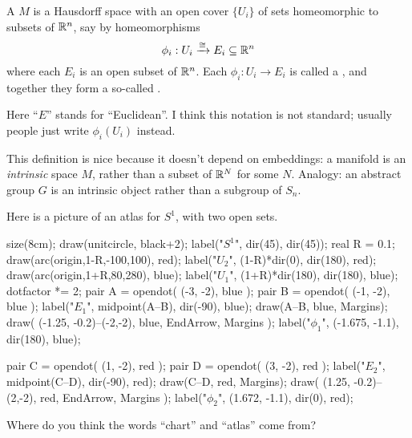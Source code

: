 \begin{definition}
	A  $M$ is a Hausdorff space
	with an open cover $\{U_i\}$ of sets
	homeomorphic to subsets of $\mathbb R^n$,
	say by homeomorphisms
	\[ \phi_i : U_i \xrightarrow{\cong} E_i \subseteq \mathbb R^n \]
	where each $E_i$ is an open subset of $\mathbb R^n$.
	Each $\phi_i \colon U_i \to E_i$ is called a ,
	and together they form a so-called .
\end{definition}
\begin{remark}
	Here ``$E$'' stands for ``Euclidean''.
	I think this notation is not standard; usually
	people just write $\phi_i(U_i)$ instead.
\end{remark}
\begin{remark}
	This definition is nice because it doesn't depend on embeddings:
	a manifold is an \emph{intrinsic} space $M$,
	rather than a subset of $\mathbb R^N$ for some $N$.
	Analogy: an abstract group $G$ is an intrinsic object
	rather than a subgroup of $S_n$.
\end{remark}

\begin{example}[An atlas on $S^1$]
Here is a picture of an atlas for $S^1$, with two open sets.
\begin{center}
	\begin{asy}
		size(8cm);
		draw(unitcircle, black+2);
		label("$S^1$", dir(45), dir(45));
		real R = 0.1;
		draw(arc(origin,1-R,-100,100), red);
		label("$U_2$", (1-R)*dir(0), dir(180), red);
		draw(arc(origin,1+R,80,280), blue);
		label("$U_1$", (1+R)*dir(180), dir(180), blue);
		dotfactor *= 2;
		pair A = opendot( (-3, -2), blue );
		pair B = opendot( (-1, -2), blue );
		label("$E_1$", midpoint(A--B), dir(-90), blue);
		draw(A--B, blue, Margins);
		draw( (-1.25, -0.2)--(-2,-2), blue, EndArrow, Margins );
		label("$\phi_1$", (-1.675, -1.1), dir(180), blue);

		pair C = opendot( (1, -2), red );
		pair D = opendot( (3, -2), red );
		label("$E_2$", midpoint(C--D), dir(-90), red);
		draw(C--D, red, Margins);
		draw( (1.25, -0.2)--(2,-2), red, EndArrow, Margins );
		label("$\phi_2$", (1.672, -1.1), dir(0), red);
	\end{asy}
\end{center}
\end{example}

\begin{ques}
	Where do you think the words ``chart'' and ``atlas'' come from?
\end{ques}

